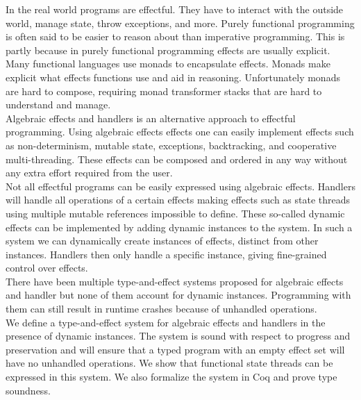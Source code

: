 In the real world programs are effectful. They have to interact with the outside world, manage state, throw exceptions, and more.
Purely functional programming is often said to be easier to reason about than imperative programming.
This is partly because in purely functional programming effects are usually explicit.
Many functional languages use monads to encapsulate effects.
Monads make explicit what effects functions use and aid in reasoning.
Unfortunately monads are hard to compose, requiring monad transformer stacks that are hard to understand and manage.
\\
Algebraic effects and handlers is an alternative approach to effectful programming.
Using algebraic effects effects one can easily implement effects such as non-determinism, mutable state, exceptions, backtracking, and cooperative multi-threading.
These effects can be composed and ordered in any way without any extra effort required from the user.
\\
Not all effectful programs can be easily expressed using algebraic effects.
Handlers will handle all operations of a certain effects making effects such as state threads using multiple mutable references impossible to define.
These so-called dynamic effects can be implemented by adding dynamic instances to the system.
In such a system we can dynamically create instances of effects, distinct from other instances.
Handlers then only handle a specific instance, giving fine-grained control over effects.
\\
There have been multiple type-and-effect systems proposed for algebraic effects and handler but none of them account for dynamic instances. Programming with them can still result in runtime crashes because of unhandled operations.
\\
We define a type-and-effect system for algebraic effects and handlers in the presence of dynamic instances.
The system is sound with respect to progress and preservation and will ensure that a typed program with an empty effect set will have no unhandled operations.
We show that functional state threads can be expressed in this system.
We also formalize the system in Coq and prove type soundness.

